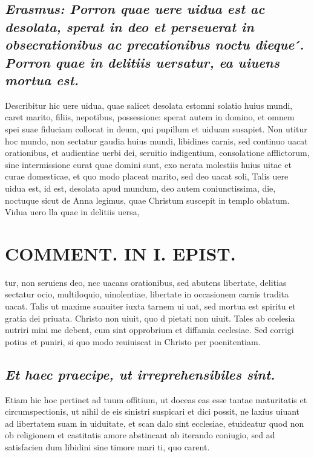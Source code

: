 \documentclass{article}
\begin{document}
\begin{pages}
\subsection*{\textit{Erasmus: Porron quae uere uidua est ac desolata, sperat in deo et perseuerat in obsecrationibus ac precationibus noctu dieque ́. Porron quae in delitiis uersatur, ea uiuens mortua est. }}\pstart Describitur hic uere uidua, quae salicet desolata estomni solatio huius mundi, caret marito, filiis, nepotibus, possessione: sperat autem in domino, et omnem spei suae fiduciam collocat in deum, qui pupillum et uiduam susapiet. Non utitur hoc mundo, non sectatur gaudia huius mundi, libidines carnis, sed continuo uacat orationibus, et audientiae uerbi dei, seruitio indigentium, consolatione afflictorum, sine intermissione curat quae domini sunt, exo nerata molestiis huius uitae et curae domesticae, et quo modo placeat marito, sed deo uacat soli, Talis uere uidua est, id est, desolata apud mundum, deo autem coniunctissima, die, noctuque sicut de Anna legimus, quae Christum suscepit in templo oblatum. Vidua uero lla quae in delitiis uersa,  \pend
\section*{COMMENT. IN I. EPIST. }
\marginpar{[ p.120 ]}\pstart tur, non seruiens deo, nec uacans orationibus, sed abutens libertate, delitias sectatur ocio, multiloquio, uinolentiae, libertate in occasionem carnis tradita uacat. Talis ut maxime suauiter iuxta tarnem ui uat, sed mortua est spiritu et gratia dei priuata. Christo non uiuit, quo d pietati non uiuit. Tales ab ccelesia nutriri mini me debent, cum sint opprobrium et diffamia ecclesiae. Sed corrigi potius et puniri, si quo modo reuiuiscat in Christo per poenitentiam.  \pend
{}
{}
\subsection*{\textit{Et haec praecipe, ut irreprehensibiles sint. }}\pstart Etiam hic hoc pertinet ad tuum offitium, ut doceas eas esse tantae maturitatis et circumspectionis, ut nihil de eis sinistri suspicari et dici possit, ne laxius uiuant ad libertatem suam in uiduitate, et scan dalo sint ecclesiae, etuideatur quod non ob religionem et castitatis amore abstincant ab iterando coniugio, sed ad satisfacien dum libidini sine timore mari ti, quo carent.  \pend
{}
{}

\end{pages}
\end{document}
